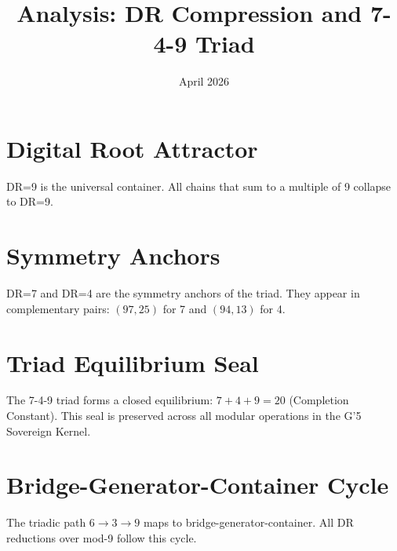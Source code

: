 \documentclass{article}
\title{Analysis: DR Compression and 7-4-9 Triad}
\date{April 2026}
\begin{document}
\maketitle

\section{Digital Root Attractor}
DR=9 is the universal container. All chains that sum to a multiple of 9 collapse to DR=9.

\section{Symmetry Anchors}
DR=7 and DR=4 are the symmetry anchors of the triad. They appear in complementary pairs: $(97, 25)$ for 7 and $(94, 13)$ for 4.

\section{Triad Equilibrium Seal}
The 7-4-9 triad forms a closed equilibrium: $7 + 4 + 9 = 20$ (Completion Constant). This seal is preserved across all modular operations in the G'5 Sovereign Kernel.

\section{Bridge-Generator-Container Cycle}
The triadic path $6 \to 3 \to 9$ maps to bridge-generator-container. All DR reductions over mod-9 follow this cycle.
\end{document}
